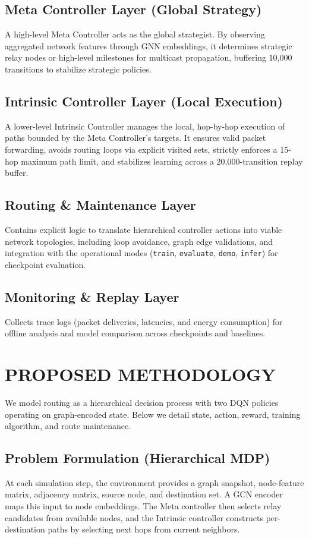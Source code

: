 \documentclass[conference]{IEEEtran}
\begin{document}
\subsection{Meta Controller Layer (Global Strategy)}
A high-level Meta Controller acts as the global strategist. By observing aggregated network features through GNN embeddings, it determines strategic relay nodes or high-level milestones for multicast propagation, buffering 10,000 transitions to stabilize strategic policies.

\subsection{Intrinsic Controller Layer (Local Execution)}
A lower-level Intrinsic Controller manages the local, hop-by-hop execution of paths bounded by the Meta Controller's targets. It ensures valid packet forwarding, avoids routing loops via explicit visited sets, strictly enforces a 15-hop maximum path limit, and stabilizes learning across a 20,000-transition replay buffer.

\subsection{Routing \& Maintenance Layer}
Contains explicit logic to translate hierarchical controller actions into viable network topologies, including loop avoidance, graph edge validations, and integration with the operational modes (\texttt{train}, \texttt{evaluate}, \texttt{demo}, \texttt{infer}) for checkpoint evaluation.

\subsection{Monitoring \& Replay Layer}
Collects trace logs (packet deliveries, latencies, and energy consumption) for offline analysis and model comparison across checkpoints and baselines.

\section{PROPOSED METHODOLOGY}
We model routing as a hierarchical decision process with two DQN policies operating on graph-encoded state. Below we detail state, action, reward, training algorithm, and route maintenance.

\subsection{Problem Formulation (Hierarchical MDP)}
At each simulation step, the environment provides a graph snapshot, node-feature matrix, adjacency matrix, source node, and destination set. A GCN encoder maps this input to node embeddings. The Meta controller then selects relay candidates from available nodes, and the Intrinsic controller constructs per-destination paths by selecting next hops from current neighbors.
\end{document}
